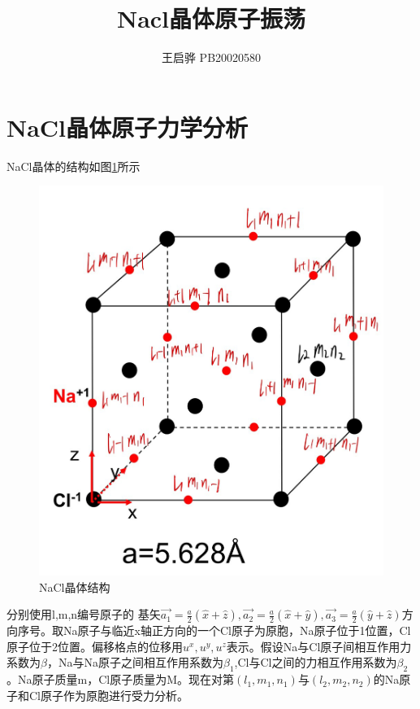 \documentclass{article}
\title{\songti \zihao{2}\bfseries Nacl晶体原子振荡}
\author{王启骅 PB20020580}
\begin{document}
	\maketitle
	\section{NaCl晶体原子力学分析}
	NaCl晶体的结构如图\ref{fig:1}所示
	\begin{figure}[!h]
	
	\centering
	\includegraphics[scale=0.3]{NaCl1}
	\caption{\heiti{}NaCl晶体结构}
	\label{fig:1}%
\end{figure}


分别使用l,m,n编号原子的
基矢$ \vec{a_1}=\frac{a}{2}(\hat{x}+\hat{z}),\vec{a_2}=\frac{a}{2}(\hat{x}+\hat{y}),\vec{a_3}=\frac{a}{2}(\hat{y}+\hat{z}) $方向序号。取Na原子与临近x轴正方向的一个Cl原子为原胞，Na原子位于1位置，Cl原子位于2位置。偏移格点的位移用$ u^x,u^y,u^z $表示。假设Na与Cl原子间相互作用力系数为$ \beta $，Na与Na原子之间相互作用系数为$ \beta_1 $,Cl与Cl之间的力相互作用系数为$ \beta_2 $。Na原子质量m，Cl原子质量为M。现在对第$ (l_1,m_1,n_1) $与$ (l_2,m_2,n_2) $的Na原子和Cl原子作为原胞进行受力分析。
\end{document}

